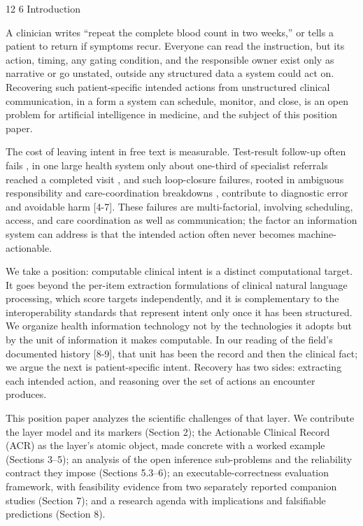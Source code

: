\documentclass[3p,twocolumn]{elsarticle}
\makeatletter
\renewcommand\section{\@startsection{section}{1}{\z@}%
           {12\p@ \@plus 4\p@ \@minus 4\p@}%
           {6\p@ \@plus 4\p@ \@minus 3\p@}%
           {\normalsize\bfseries\boldmath}}
\makeatother
\begin{document}
\section{Introduction}\label{introduction}

A clinician writes ``repeat the complete blood count in two weeks,'' or tells a patient to return if symptoms recur. Everyone can read the instruction, but its action, timing, any gating condition, and the responsible owner exist only as narrative or go unstated, outside any structured data a system could act on. Recovering such patient-specific intended actions from unstructured clinical communication, in a form a system can schedule, monitor, and close, is an open problem for artificial intelligence in medicine, and the subject of this position paper.

The cost of leaving intent in free text is measurable. Test-result follow-up often fails \cite{ref1}, in one large health system only about one-third of specialist referrals reached a completed visit \cite{ref2}, and such loop-closure failures, rooted in ambiguous responsibility and care-coordination breakdowns \cite{ref3}, contribute to diagnostic error and avoidable harm {[}4-7{]}. These failures are multi-factorial, involving scheduling, access, and care coordination as well as communication; the factor an information system can address is that the intended action often never becomes machine-actionable.

We take a position: computable clinical intent is a distinct computational target. It goes beyond the per-item extraction formulations of clinical natural language processing, which score targets independently, and it is complementary to the interoperability standards that represent intent only once it has been structured. We organize health information technology not by the technologies it adopts but by the unit of information it makes computable. In our reading of the field's documented history {[}8-9{]}, that unit has been the record and then the clinical fact; we argue the next is patient-specific intent. Recovery has two sides: extracting each intended action, and reasoning over the set of actions an encounter produces.

This position paper analyzes the scientific challenges of that layer. We contribute the layer model and its markers (Section 2); the Actionable Clinical Record (ACR) as the layer's atomic object, made concrete with a worked example (Sections 3--5); an analysis of the open inference sub-problems and the reliability contract they impose (Sections 5.3--6); an executable-correctness evaluation framework, with feasibility evidence from two separately reported companion studies (Section 7); and a research agenda with implications and falsifiable predictions (Section 8).
\end{document}
